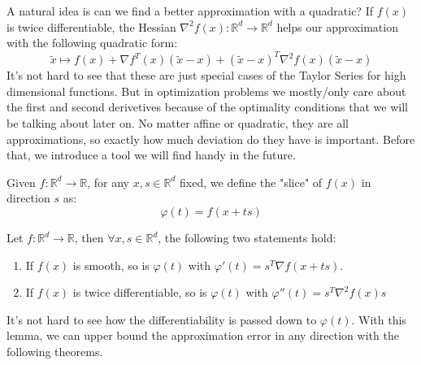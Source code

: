 A natural idea is can we find a better approximation with a quadratic? If $f(x)$ is twice differentiable, the Hessian $\nabla^2f(x): \mathbb{R}^d \rightarrow \mathbb{R}^d$ helps our approximation with the following quadratic form:
\begin{equation*}
    \tilde{x} \mapsto f(x) + \nabla f^T(x)(\tilde{x}-x) + (\tilde{x}-x)^T\nabla^2 f(x)(\tilde{x}-x)
\end{equation*}
It's not hard to see that these are just special cases of the Taylor Series for high dimensional functions. But in optimization problems we mostly/only care about the first and second derivetives because of the optimality conditions that we will be talking about later on. No matter affine or quadratic, they are all approximations, so exactly how much deviation do they have is important. Before that, we introduce a tool we will find handy in the future.

\begin{definition}
    Given $f:\mathbb{R}^d \rightarrow \mathbb{R}$, for any $x, s \in \mathbb{R}^d$ fixed, we define the "slice" of $f(x)$ in direction $s$ as:
    \begin{equation*}
        \varphi(t) = f(x + ts)
    \end{equation*}
\end{definition}

\begin{lemma}
    Let $f:\mathbb{R}^d \rightarrow \mathbb{R}$, then $\forall x,s \in \mathbb{R}^d$, the following two statements hold:
    \begin{enumerate}
        \item If $f(x)$ is smooth, so is $\varphi(t)$ with $\varphi'(t) = s^T \nabla f(x+ts)$.
        \item If $f(x)$ is twice differentiable, so is $\varphi(t)$ with $\varphi''(t) = s^T \nabla^2 f(x) s$
    \end{enumerate}
\end{lemma}

It's not hard to see how the differentiability is passed down to $\varphi(t)$. With this lemma, we can upper bound the approximation error in any direction with the following theorems.

